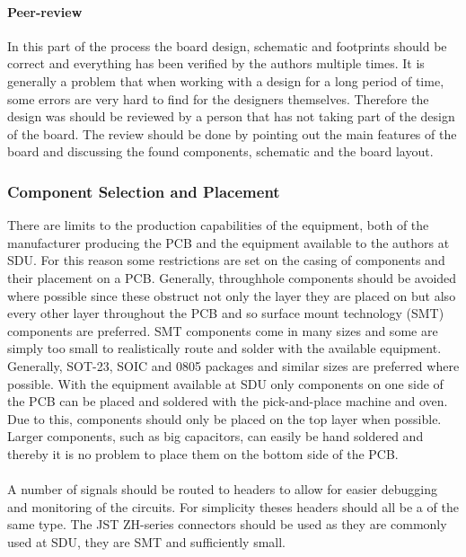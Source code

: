 \paragraph{Peer-review}
In this part of the process the board design, schematic and footprints should be correct and everything has been verified by the authors multiple times.
It is generally a problem that when working with a design for a long period of time, some errors are very hard to find for the designers themselves. 
Therefore the design was should be reviewed by a person that has not taking part of the design of the board.
The review should be done by pointing out the main features of the board and discussing the found components, schematic and the board layout.


\subsubsection{Component Selection and Placement} %
\label{ssub:component_case_selection_and_placement}
There are limits to the production capabilities of the equipment, both of the manufacturer producing the PCB and the equipment available to the authors at SDU.
For this reason some restrictions are set on the casing of components and their placement on a PCB.
Generally, throughhole components should be avoided where possible since these obstruct not only the layer they are placed on but also every other layer throughout the PCB and so surface mount technology (SMT) components are preferred.
SMT components come in many sizes and some are simply too small to realistically route and solder with the available equipment.
Generally, SOT-23, SOIC and 0805 packages and similar sizes are preferred where possible.
With the equipment available at SDU only components on one side of the PCB can be placed and soldered with the pick-and-place machine and oven.
Due to this, components should only be placed on the top layer when possible.
Larger components, such as big capacitors, can easily be hand soldered and thereby it is no problem to place them on the bottom side of the PCB.
\\~\\
A number of signals should be routed to headers to allow for easier debugging and monitoring of the circuits.
For simplicity theses headers should all be a of the same type. 
The JST ZH-series connectors should be used as they are commonly used at SDU, they are SMT and sufficiently small. 


